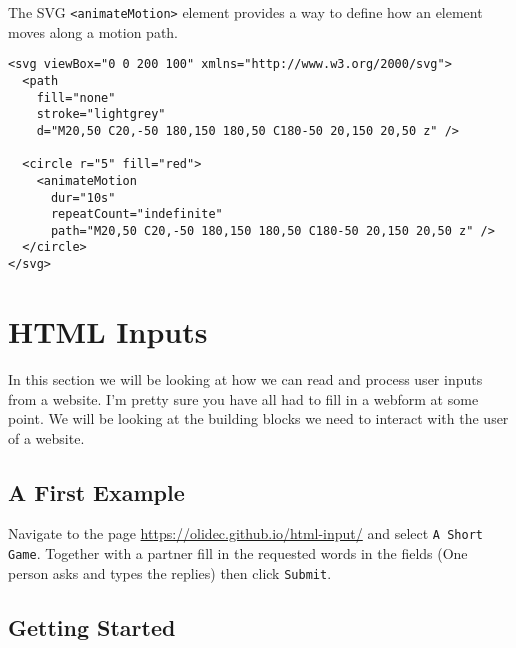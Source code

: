 \documentclass[english,11pt,a4paper]{report}
\begin{document}
The SVG \verb|<animateMotion>| element provides a way to define how an element moves along a motion path.

\begin{lstlisting}
<svg viewBox="0 0 200 100" xmlns="http://www.w3.org/2000/svg">
  <path
    fill="none"
    stroke="lightgrey"
    d="M20,50 C20,-50 180,150 180,50 C180-50 20,150 20,50 z" />

  <circle r="5" fill="red">
    <animateMotion
      dur="10s"
      repeatCount="indefinite"
      path="M20,50 C20,-50 180,150 180,50 C180-50 20,150 20,50 z" />
  </circle>
</svg>
\end{lstlisting}

\newpage
\section{HTML Inputs}

In this section we will be looking at how we can read and process user inputs from a website. I'm pretty sure you have all had to fill in  a webform at some point. We will be looking at the building blocks we need to interact with the user of a website.

\subsection{A First Example}
\begin{ex}
Navigate to the page \url{https://olidec.github.io/html-input/} and select \verb|A Short Game|. Together with a partner fill in the requested words in the fields (One person asks and types the replies) then click \verb|Submit|. 
\end{ex}


\subsection{Getting Started}
\end{document}
